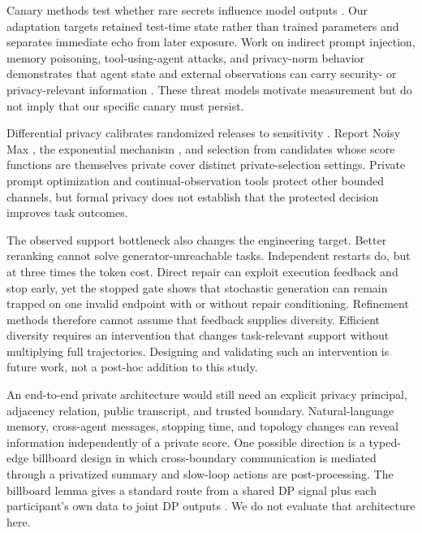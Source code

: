 \documentclass{article}
\begin{document}
Canary methods test whether rare secrets influence model outputs \citep{carlini2019secret}. Our adaptation targets retained test-time state rather than trained parameters and separates immediate echo from later exposure. Work on indirect prompt injection, memory poisoning, tool-using-agent attacks, and privacy-norm behavior demonstrates that agent state and external observations can carry security- or privacy-relevant information \citep{greshake2023indirect,chen2024agentpoison,debenedetti2024agentdojo,shao2024privacylens}. These threat models motivate measurement but do not imply that our specific canary must persist.

Differential privacy calibrates randomized releases to sensitivity \citep{dwork2006calibrating,dwork2014foundations}. Report Noisy Max \citep{dwork2014foundations}, the exponential mechanism \citep{mcsherry2007mechanism}, and selection from candidates whose score functions are themselves private \citep{liu2019private} cover distinct private-selection settings. Private prompt optimization \citep{hong2024dpopt} and continual-observation tools \citep{dwork2010continual} protect other bounded channels, but formal privacy does not establish that the protected decision improves task outcomes.

The observed support bottleneck also changes the engineering target. Better reranking cannot solve generator-unreachable tasks. Independent restarts do, but at three times the token cost. Direct repair can exploit execution feedback and stop early, yet the stopped gate shows that stochastic generation can remain trapped on one invalid endpoint with or without repair conditioning. Refinement methods therefore cannot assume that feedback supplies diversity. Efficient diversity requires an intervention that changes task-relevant support without multiplying full trajectories. Designing and validating such an intervention is future work, not a post-hoc addition to this study.

An end-to-end private architecture would still need an explicit privacy principal, adjacency relation, public transcript, and trusted boundary. Natural-language memory, cross-agent messages, stopping time, and topology changes can reveal information independently of a private score. One possible direction is a typed-edge billboard design in which cross-boundary communication is mediated through a privatized summary and slow-loop actions are post-processing. The billboard lemma gives a standard route from a shared DP signal plus each participant's own data to joint DP outputs \citep{hsu2014private}. We do not evaluate that architecture here.
\end{document}
